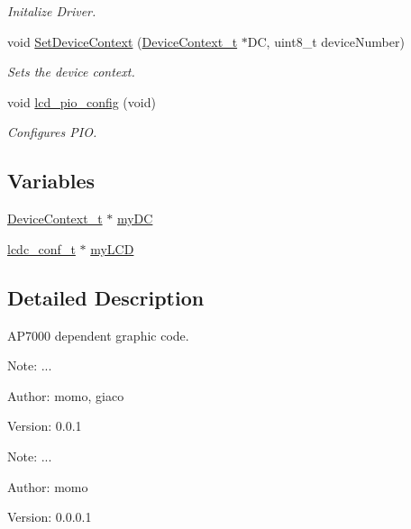 \begin{CompactItemize}
\begin{CompactList}\small\item\em Initalize Driver. \item\end{CompactList}\item 
void \hyperlink{group__ap7000__lcd_gf5e9e0c22e0b24937dd062a816e80cfc}{SetDeviceContext} (\hyperlink{struct_device_context__t}{DeviceContext\_\-t} $\ast$DC, uint8\_\-t deviceNumber)
\begin{CompactList}\small\item\em Sets the device context. \item\end{CompactList}\item 
\hypertarget{group__ap7000__lcd_g56383c24c79cdc986208c6cd3dacc081}{
void \hyperlink{group__ap7000__lcd_g56383c24c79cdc986208c6cd3dacc081}{lcd\_\-pio\_\-config} (void)}
\label{group__ap7000__lcd_g56383c24c79cdc986208c6cd3dacc081}

\begin{CompactList}\small\item\em Configures PIO. \item\end{CompactList}\end{CompactItemize}
\subsection*{Variables}
\begin{CompactItemize}
\item 
\hyperlink{struct_device_context__t}{DeviceContext\_\-t} $\ast$ \hyperlink{group__ap7000__lcd_gba0cd39ac57537de654bae9fd5bab786}{myDC}
\item 
\hyperlink{structlcdc__configuration__s}{lcdc\_\-conf\_\-t} $\ast$ \hyperlink{group__ap7000__lcd_ga3707e3377bafcb6d796ce38a46273c5}{myLCD}
\end{CompactItemize}


\subsection{Detailed Description}
AP7000 dependent graphic code. 

\begin{Desc}
\item[Note:]... \end{Desc}
\begin{Desc}
\item[Author:]momo, giaco \end{Desc}
\begin{Desc}
\item[Version:]0.0.1\end{Desc}
\begin{Desc}
\item[Note:]... \end{Desc}
\begin{Desc}
\item[Author:]momo \end{Desc}
\begin{Desc}
\item[Version:]0.0.0.1 \end{Desc}


